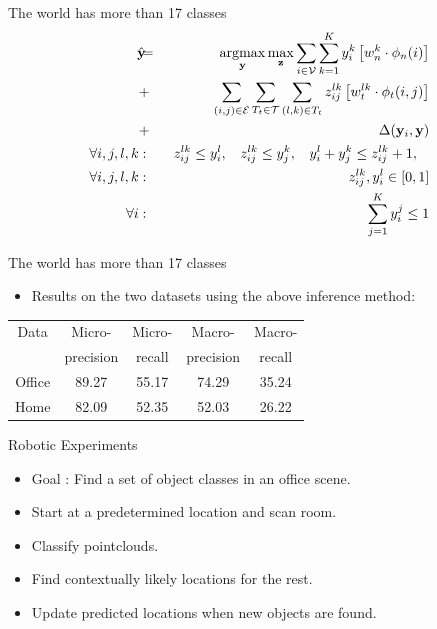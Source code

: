 \documentclass{beamer}
\DeclareMathOperator*{\argmax}{argmax}
\newcommand{\y}{{\mathbf y}}     %
\newcommand{\ysc}[2]{{y_{#1}^{#2}}}    %
\newcommand{\zsc}[2]{{z_{#1}^{#2}}}    %
\newcommand{\fn}[1]{{\phi_n(#1)}}      %
\newcommand{\fe}[3]{{\phi_{#1}(#2,#3)}}%
\newcommand{\wn}[1]{{w_n^{#1}}}        %
\newcommand{\we}[3]{{w_{#1}^{#2#3}}}   %
\newcommand{\loss}[2]{{\Delta(#1,#2)}}   %
\begin{document}
\begin{frame}{The world has more than 17 classes}
 \begin{eqnarray*}
\hat{\y}\!\!\!&=&\!\!\!\argmax_{\y}\max_{\mathbf z} \sum_{i \in \mathcal{V}} \sum_{k=1}^{K} \ysc{i}{k} \left[\wn{k} \cdot \fn{i} \right] \\
&+&  \!\!\!\sum_{(i,j)\in \mathcal{E}}  \sum_{T_t \in {\cal T}} \sum_{(l,k)\in T_t} \zsc{ij}{lk} \left[\we{t}{l}{k} \cdot \fe{t}{i}{j}\right] \\
&+& \loss{\y_i}{\y} \label{eq:relaxobj}\\
\forall i,j,l,k &:& \:\: \zsc{ij}{lk}\le \ysc{i}{l}, \:\:\:\:
\zsc{ij}{lk}\le \ysc{j}{k},\:\:\:\:
\ysc{i}{l} + \ysc{j}{k} \le \zsc{ij}{lk}+1,\:\:\:\: \\
\forall i,j,l,k &:& \zsc{ij}{lk},\ysc{i}{l} \in [ 0,1 ] \label{eq:relaxconst} \\
\forall i &:& \sum_{j=1}^{K} y_i^j \le 1
\end{eqnarray*} 
\end{frame}


\begin{frame}{The world has more than 17 classes}
\begin{itemize}
\item Results on the two datasets using the above inference method:
\end{itemize}

\begin{center}
\begin{tabular}{c | c | c | c | c}
Data & Micro-  & Micro-  & Macro-  & Macro-\\
 &  precision &  recall &  precision &  recall\\
\hline
Office & 89.27 & 55.17 & 74.29 & 35.24 \\
Home & 82.09 & 52.35 & 52.03 & 26.22 \\
\hline
\end{tabular}
\end{center}
\end{frame}

\begin{frame}{Robotic Experiments}

\begin{itemize}
\item Goal : Find a set of object classes in an office scene.
\item Start at a predetermined location and scan room. 
\item Classify pointclouds. 
\item Find contextually likely locations for the rest.
\item Update predicted locations when new objects are found.
\end{itemize}

\end{frame}
\end{document}
